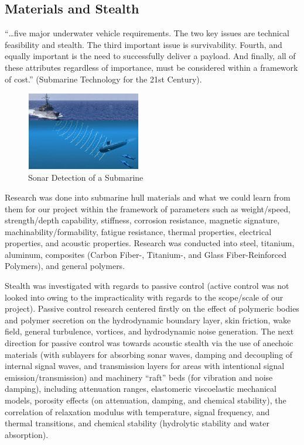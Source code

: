 \documentclass{report}
\begin{document}
\subsection{Materials and Stealth}

“…five major underwater vehicle requirements.  The two key issues are technical feasibility and stealth.  The third important issue is survivability.  Fourth, and equally important is the need to successfully deliver a payload.  And finally, all of these attributes regardless of importance, must be considered within a framework of cost.” (Submarine Technology for the 21st Century).\par
\begin{figure}[h]
\centering
\includegraphics[width=5cm]{"Submarine Stealth"}
\caption{Sonar Detection of a Submarine}
\end{figure}
Research was done into submarine hull materials and what we could learn from them for our project within the framework of parameters such as weight/speed, strength/depth capability, stiffness, corrosion resistance, magnetic signature, machinability/formability, fatigue resistance, thermal properties, electrical properties, and acoustic properties.  Research was conducted into steel, titanium, aluminum, composites (Carbon Fiber-, Titanium-, and Glass Fiber-Reinforced Polymers), and general polymers.\par
\par Stealth was investigated with regards to passive control (active control was not looked into owing to the impracticality with regards to the scope/scale of our project).  Passive control research centered firstly on the effect of polymeric bodies and polymer secretion on the hydrodynamic boundary layer, skin friction, wake field, general turbulence, vortices, and hydrodynamic noise generation.  The next direction for passive control was towards acoustic stealth via the use of anechoic materials (with sublayers for absorbing sonar waves, damping and decoupling of internal signal waves, and transmission layers for areas with intentional signal emission/transmission) and machinery “raft” beds (for vibration and noise damping), including attenuation ranges, elastomeric viscoelastic mechanical models, porosity effects (on attenuation, damping, and chemical stability), the correlation of relaxation modulus with temperature, signal frequency, and thermal transitions, and chemical stability (hydrolytic stability and water absorption).
\end{document}
